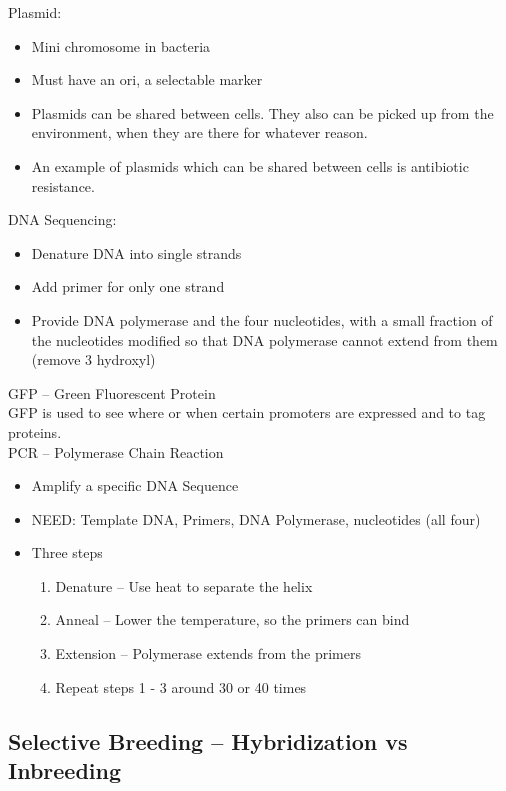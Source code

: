 \documentclass{article}
\begin{document}
Plasmid:
\begin{itemize}
\item Mini chromosome in bacteria
\item Must have an ori, a selectable marker
\item Plasmids can be shared between cells. They also can be picked up from the
environment, when they are there for whatever reason.
\item An example of plasmids which can be shared between cells is antibiotic resistance.
\end{itemize}

DNA Sequencing:
\begin{itemize}
\item Denature DNA into single strands
\item Add primer for only one strand
\item Provide DNA polymerase and the four nucleotides, with a small fraction of the nucleotides modified so that DNA polymerase cannot extend from them (remove 3 hydroxyl)
\end{itemize}

GFP -- Green Fluorescent Protein\\
\indent GFP is used to see where or when certain promoters are expressed and to tag proteins.\\

PCR -- Polymerase Chain Reaction\\
\begin{itemize}
\item Amplify a specific DNA Sequence
\item NEED: Template DNA, Primers, DNA Polymerase, nucleotides (all four)
\item Three steps
\begin{enumerate}
\item Denature -- Use heat to separate the helix
\item Anneal -- Lower the temperature, so the primers can bind
\item Extension -- Polymerase extends from the primers
\item Repeat steps 1 - 3 around 30 or 40 times
\end{enumerate}

\end{itemize}


\subsection{Selective Breeding -- Hybridization vs Inbreeding}
\end{document}
